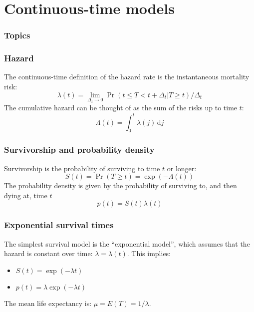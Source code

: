 \documentclass[color=usenames,dvipsnames]{beamer}\usepackage[]{graphicx}\usepackage[]{color}
\begin{document}
\section{Continuous-time models}



\begin{frame}[plain]
  \frametitle{Topics}
  \Large
  \tableofcontents[currentsection]
\end{frame}


\begin{frame}
  \frametitle{Hazard}
  The continuous-time definition of the hazard rate is the
  instantaneous mortality risk:
  \[
    \lambda(t) = \lim_{\Delta_t \to 0} \Pr(t \le T < t+\Delta_t | T\ge t)/\Delta_t
  \]
  \pause
  \vfill
  The cumulative hazard can be thought of as the sum of the risks up
  to time $t$:
  \[
    \Lambda(t) = \int_{0}^t \lambda(j) \,\mathrm{d}j
  \]
\end{frame}


\begin{frame}
  \frametitle{Survivorship and probability density}
  Survivorship is the probability of surviving to time $t$ or longer:
  \[
    S(t) = \Pr(T \ge t) = \exp(-\Lambda(t))
    \]
  \pause
  \vfill
  The probability density is given by the probability of surviving to,
  and then dying at, time $t$
  \[
    p(t) = S(t)\lambda(t) %
  \]
\end{frame}



\begin{frame}
  \frametitle{Exponential survival times}
  The simplest survival model is the ``exponential model'',
  which assumes that the hazard is constant over
  time: $\lambda = \lambda(t)$.
  \pause
  \vfill
  This implies:
  \begin{itemize}
    \item $S(t) = \exp(-\lambda t)$
    \item $p(t) = \lambda \exp(-\lambda t)$
  \end{itemize}
  \pause
  \vfill
  The mean life expectancy is: $\mu = E(T) = 1/\lambda$. 
\end{frame}
\end{document}
